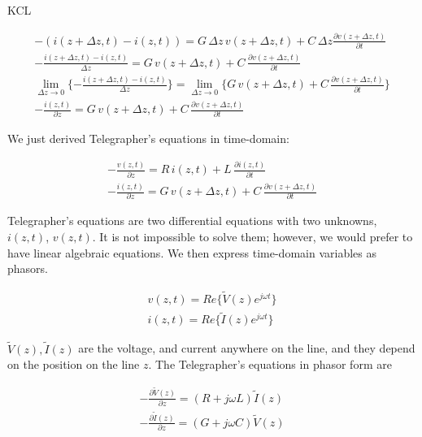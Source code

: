 \documentclass{ximera}
\begin{document}
KCL

\begin{eqnarray}
-( i(z+ \Delta z ,t)- i(z,t))= G  \, \Delta z  \, v(z+\Delta z,t)+ C \, \Delta z
\frac{\partial v(z+\Delta z,t)}{\partial t} \label{te1kc11} \\
-\frac{ i(z+ \Delta z ,t)- i(z,t)}{\Delta z}= G  \, v(z+\Delta z,t)+C \, 
\frac{\partial v(z+\Delta z,t)}{\partial t} \label{te1kc21} \\
\lim_{\Delta z \to 0} \{-\frac{ i(z+ \Delta z ,t)- i(z,t)}{\Delta z} \}= \lim_{\Delta z \to 0} \{ G  \, v(z+\Delta z,t)+C \, 
\frac{\partial v(z+\Delta z,t)}{\partial t} \} \label{te1kc211} \\
-\frac{i(z,t) }{\partial z}= G  \, v(z+\Delta z,t)+C \, 
\frac{\partial v(z+\Delta z,t)}{\partial t} \label{te1kc31}
\end{eqnarray}



We just derived Telegrapher's equations in time-domain:



\begin{eqnarray}
-\frac{v(z,t) }{\partial z}=R  \, i(z,t)+L  \, 
 \frac{\partial i(z,t)}{\partial t} \nonumber  \\ \nonumber
-\frac{i(z,t) }{\partial z}= G \,  v(z+\Delta z,t)+C \, 
\frac{\partial v(z+\Delta z,t)}{\partial t} 
\end{eqnarray}


Telegrapher's equations are two differential equations with two unknowns, $i(z, t)$, $v(z, t)$. It is not
impossible to solve them; however, we would prefer to have linear algebraic equations. We then express time-domain variables as phasors.

\begin{eqnarray}
v(z,t)=Re\{ \tilde{V}(z) e^{j \omega t} \} \nonumber \\
i(z,t)=Re\{ \tilde{I}(z) e^{j \omega t} \} \nonumber
\end{eqnarray}

 $\tilde{V}(z),\tilde{I}(z) $ are the voltage, and current anywhere on the line, and they depend on the position on the line $z$. The Telegrapher's equations in phasor form are


\begin{eqnarray}
-\frac{\partial \tilde{V}(z)}{\partial z} = (R+j\omega L) \tilde{I}(z) \label{te11}\\
-\frac{\partial \tilde{I}(z)}{\partial z} = (G+j\omega C) \tilde{V}(z) \label{te121}
\end{eqnarray}
\end{document}
